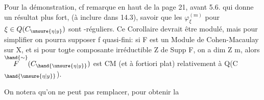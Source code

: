 Pour la démonstration, cf remarque en haut de la page 21, avant 5.6. qui donne un résultat plus fort, (à inclure dans 14.3), savoir que les $\varphi^{(m)}_{\xi}$ pour $\xi\in Q(C_{\unsure{\eta|y}})$ sont -réguliers.
Ce Corollaire devrait être modulé, mais pour simplifier on pourra
supposer f quasi-fini: si F est un Module de Cohen-Macaulay sur X, et si
pour to\uline{u}te composante irréductible Z de Supp F, on a dim Z \hand{$\geqslant$} m, alors
$\overset{\hand{\sim}}{F}(C_{\hand{\unsure{\eta|y}}})$ est CM (et à fortiori plat) relativement à Q(C$_{\hand{\unsure{\eta|y}}}$).

On notera qu'on ne peut pas remplacer, pour obtenir la

